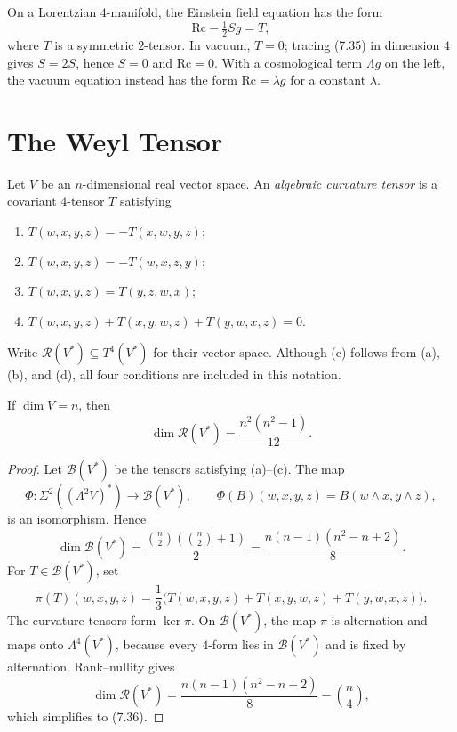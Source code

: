 On a Lorentzian $4$-manifold, the Einstein field equation has the form
\begin{equation}
\mathrm{Rc}-\tfrac12Sg=T,
\tag{7.35}
\end{equation}
where $T$ is a symmetric $2$-tensor. In vacuum, $T=0$; tracing (7.35) in
dimension $4$ gives $S=2S$, hence $S=0$ and $\mathrm{Rc}=0$. With a
cosmological term $\Lambda g$ on the left, the vacuum equation instead has
the form $\mathrm{Rc}=\lambda g$ for a constant $\lambda$.
\section{The Weyl Tensor}

Let $V$ be an $n$-dimensional real vector space.  An \emph{algebraic
curvature tensor} is a covariant $4$-tensor $T$ satisfying
\begin{enumerate}
\item[(a)] $T(w,x,y,z)=-T(x,w,y,z)$;
\item[(b)] $T(w,x,y,z)=-T(w,x,z,y)$;
\item[(c)] $T(w,x,y,z)=T(y,z,w,x)$;
\item[(d)] $T(w,x,y,z)+T(x,y,w,z)+T(y,w,x,z)=0$.
\end{enumerate}
Write $\mathscr R(V^*)\subseteq T^4(V^*)$ for their vector space.  Although
(c) follows from (a), (b), and (d), all four conditions are included in this
notation.

\begin{proposition}
\label{prop:dim-algebraic-curvature-tensors}
If $\dim V=n$, then
\begin{equation}
\dim \mathscr{R}(V^*) = \frac{n^2(n^2-1)}{12}. \tag{7.36}
\end{equation}
\end{proposition}

\begin{proof}
\sketch
Let $\mathscr B(V^*)$ be the tensors satisfying (a)--(c).  The map
\[
\Phi:\Sigma^2((\Lambda^2V)^*)\longrightarrow\mathscr B(V^*),
\qquad
\Phi(B)(w,x,y,z)=B(w\wedge x,y\wedge z),
\]
is an isomorphism.  Hence
\[
\dim\mathscr B(V^*)
=\frac{\binom n2(\binom n2+1)}2
=\frac{n(n-1)(n^2-n+2)}8.
\]
For $T\in\mathscr B(V^*)$, set
\[
\pi(T)(w,x,y,z)=\frac13\bigl(T(w,x,y,z)+T(x,y,w,z)+T(y,w,x,z)\bigr).
\]
The curvature tensors form $\ker\pi$.  On $\mathscr B(V^*)$, the map $\pi$
is alternation and maps onto $\Lambda^4(V^*)$, because every $4$-form lies
in $\mathscr B(V^*)$ and is fixed by alternation.  Rank--nullity gives
\[
\dim\mathscr R(V^*)
=\frac{n(n-1)(n^2-n+2)}8-\binom n4,
\]
which simplifies to (7.36).
\end{proof}

